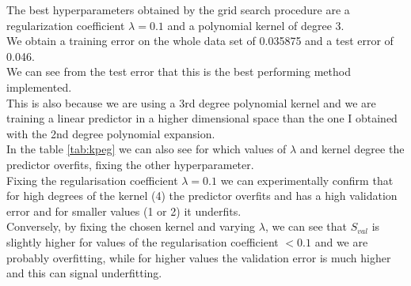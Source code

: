 % 
The best hyperparameters obtained by the grid search procedure are a regularization coefficient $\lambda = 0.1$ and a polynomial kernel of degree 3.\\
We obtain a training error on the whole data set of 0.035875 and a test error of 0.046.\\
We can see from the test error that this is the best performing method implemented.\\
This is also because we are using a 3rd degree polynomial kernel and we are training a linear predictor in a higher dimensional space than the one I obtained with the 2nd degree polynomial expansion.\\
In the table \ref{tab:kpeg} we can also see for which values of $\lambda$ and kernel degree the predictor overfits, fixing the other hyperparameter.\\
Fixing the regularisation coefficient $\lambda = 0.1$ we can experimentally confirm that for high degrees of the kernel (4) the predictor overfits and has a high validation error and for smaller values (1 or 2) it underfits.\\
Conversely, by fixing the chosen kernel and varying $\lambda$, we can see that $S_{val}$ is slightly higher for values of the regularisation coefficient $< 0.1$ and we are probably overfitting, while for higher values the validation error is much higher and this can signal underfitting.\\

